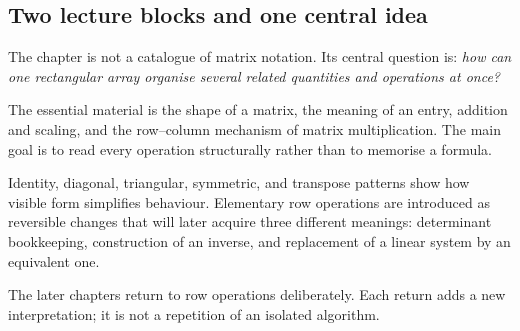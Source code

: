 \subsection{Two lecture blocks and one central idea}

The chapter is not a catalogue of matrix notation. Its central question is: \emph{how can one rectangular array organise several related quantities and operations at once?}

\begin{corebox}
The essential material is the shape of a matrix, the meaning of an entry, addition and scaling, and the row--column mechanism of matrix multiplication. The main goal is to read every operation structurally rather than to memorise a formula.
\end{corebox}

\begin{corebox}
Identity, diagonal, triangular, symmetric, and transpose patterns show how visible form simplifies behaviour. Elementary row operations are introduced as reversible changes that will later acquire three different meanings: determinant bookkeeping, construction of an inverse, and replacement of a linear system by an equivalent one.
\end{corebox}

The later chapters return to row operations deliberately. Each return adds a new interpretation; it is not a repetition of an isolated algorithm.
